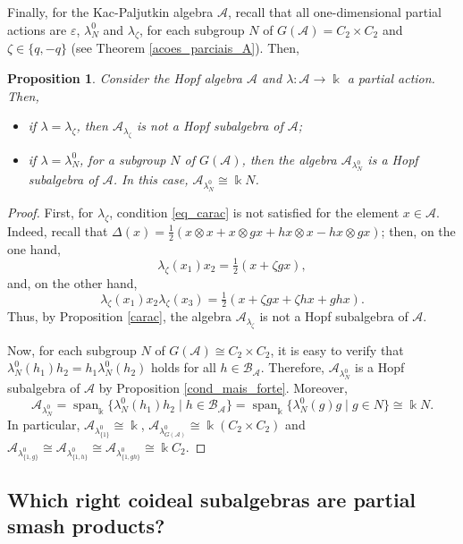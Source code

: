 \documentclass[reqno]{amsart}
\newtheorem{prop}[thm]{Proposition}
\theoremstyle{definition}
\DeclareMathOperator{\spn}{span}
\numberwithin{equation}{section}\theoremstyle{plain}
\newcommand{\B}{\mathcal{B}}
\theoremstyle{definition}
\def \k {\Bbbk}
\def \A {\mathcal{A}}
\begin{document}
Finally, for the Kac-Paljutkin algebra $\A$, recall that all one-dimensional partial actions are $\varepsilon$, $\lambda_N^0$ and $\lambda_\zeta$, for each subgroup $N$ of $G(\A)=C_2\times C_2$ and $ \zeta \in \{q, -q \}$ (see Theorem \ref{acoes_parciais_A}). Then,

\begin{prop}
Consider the Hopf algebra $\A$ and $\lambda: \A \to \k$ a partial action.
Then,
\begin{itemize}
\item if $\lambda = \lambda_\zeta$, then $\A_{\lambda_{\zeta}}$ is not a Hopf subalgebra of $\A$;
\item if $\lambda=\lambda_N^0$, for a subgroup $N$ of $G(\A)$, then the algebra $\A_{\lambda_N^0}$ is a Hopf subalgebra of $\A$. In this case, $\A_{\lambda_N^0}\cong \k N$.
\end{itemize}
\end{prop}

\begin{proof} 
First, for $\lambda_\zeta$, condition \eqref{eq_carac} is not satisfied for the element $x\in \A$.
Indeed, recall that $\Delta(x) = 
\tfrac{1}{2}(x\otimes x+x\otimes gx+hx\otimes x-hx\otimes gx)$; then, on the one hand,
\begin{equation*}
 \lambda_\zeta(x_1)x_2 = \tfrac{1}{2}(x+\zeta gx),   
\end{equation*}
and, on the other hand,
\begin{equation*}
 \lambda_\zeta(x_1)x_2\lambda_\zeta(x_3)= \tfrac{1}{2}(x+\zeta gx+\zeta hx+ghx).   
\end{equation*}
Thus, by Proposition \ref{carac}, the algebra $\A_{\lambda_\zeta}$ is not a Hopf subalgebra of $\A$.

Now, for each subgroup $N$ of $G(\A)\cong C_2 \times C_2$, it is easy to verify that $\lambda_N^0(h_1)h_2=h_1 \lambda_N^0(h_2)$ holds for all $h\in\B_\A$.
Therefore, $\A_{\lambda_N^0}$ is a Hopf subalgebra of $\A$ by Proposition \ref{cond_mais_forte}.
Moreover, $$\A_{\lambda_N^0} = \spn_\k\{\lambda_N^0(h_1)h_2 \mid h \in \B_\A\} = \spn_\k\{\lambda_N^0(g)g \mid g \in N\} \cong \k N.$$
In particular, 
$\A_{\lambda_{\{1\}}^0}\cong \Bbbk$, $\A_{\lambda_{G(\A)}^0}\cong \Bbbk(C_2\times C_2)$ and $\A_{\lambda_{\{1,g\}}^0}\cong \A_{\lambda_{\{1,h\}}^0}\cong \A_{\lambda_{\{1,gh\}}^0}\cong\Bbbk C_2$.
\end{proof}

    \subsection{Which right coideal subalgebras are partial smash products?}\label{right coideal subalgebras}
\end{document}

